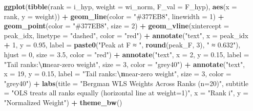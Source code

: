 \documentclass[
]{article}
\newenvironment{Shaded}{\begin{snugshade}}{\end{snugshade}}
\newcommand{\AttributeTok}[1]{\textcolor[rgb]{0.13,0.29,0.53}{#1}}
\newcommand{\DecValTok}[1]{\textcolor[rgb]{0.00,0.00,0.81}{#1}}
\newcommand{\FloatTok}[1]{\textcolor[rgb]{0.00,0.00,0.81}{#1}}
\newcommand{\FunctionTok}[1]{\textcolor[rgb]{0.13,0.29,0.53}{\textbf{#1}}}
\newcommand{\NormalTok}[1]{#1}
\newcommand{\SpecialCharTok}[1]{\textcolor[rgb]{0.81,0.36,0.00}{\textbf{#1}}}
\newcommand{\StringTok}[1]{\textcolor[rgb]{0.31,0.60,0.02}{#1}}
\begin{document}
\begin{Shaded}
\begin{Highlighting}[]
\FunctionTok{ggplot}\NormalTok{(}\FunctionTok{tibble}\NormalTok{(}\AttributeTok{rank =}\NormalTok{ i\_hyp, }\AttributeTok{weight =}\NormalTok{ wi\_norm, }\AttributeTok{F\_val =}\NormalTok{ F\_hyp),}
       \FunctionTok{aes}\NormalTok{(}\AttributeTok{x =}\NormalTok{ rank, }\AttributeTok{y =}\NormalTok{ weight)) }\SpecialCharTok{+}
  \FunctionTok{geom\_line}\NormalTok{(}\AttributeTok{color =} \StringTok{"\#377EB8"}\NormalTok{, }\AttributeTok{linewidth =} \DecValTok{1}\NormalTok{) }\SpecialCharTok{+}
  \FunctionTok{geom\_point}\NormalTok{(}\AttributeTok{color =} \StringTok{"\#377EB8"}\NormalTok{, }\AttributeTok{size =} \DecValTok{2}\NormalTok{) }\SpecialCharTok{+}
  \FunctionTok{geom\_vline}\NormalTok{(}\AttributeTok{xintercept =}\NormalTok{ peak\_idx, }\AttributeTok{linetype =} \StringTok{"dashed"}\NormalTok{, }\AttributeTok{color =} \StringTok{"red"}\NormalTok{) }\SpecialCharTok{+}
  \FunctionTok{annotate}\NormalTok{(}\StringTok{"text"}\NormalTok{, }\AttributeTok{x =}\NormalTok{ peak\_idx }\SpecialCharTok{+} \DecValTok{1}\NormalTok{, }\AttributeTok{y =} \FloatTok{0.95}\NormalTok{,}
           \AttributeTok{label =} \FunctionTok{paste0}\NormalTok{(}\StringTok{"Peak at F ≈ "}\NormalTok{, }\FunctionTok{round}\NormalTok{(peak\_F, }\DecValTok{3}\NormalTok{), }\StringTok{" ≈ 0.632"}\NormalTok{),}
           \AttributeTok{hjust =} \DecValTok{0}\NormalTok{, }\AttributeTok{size =} \FloatTok{3.5}\NormalTok{, }\AttributeTok{color =} \StringTok{"red"}\NormalTok{) }\SpecialCharTok{+}
  \FunctionTok{annotate}\NormalTok{(}\StringTok{"text"}\NormalTok{, }\AttributeTok{x =} \DecValTok{2}\NormalTok{, }\AttributeTok{y =} \FloatTok{0.15}\NormalTok{, }\AttributeTok{label =} \StringTok{"Tail ranks:}\SpecialCharTok{\textbackslash{}n}\StringTok{near{-}zero weight"}\NormalTok{,}
           \AttributeTok{size =} \DecValTok{3}\NormalTok{, }\AttributeTok{color =} \StringTok{"grey40"}\NormalTok{) }\SpecialCharTok{+}
  \FunctionTok{annotate}\NormalTok{(}\StringTok{"text"}\NormalTok{, }\AttributeTok{x =} \DecValTok{19}\NormalTok{, }\AttributeTok{y =} \FloatTok{0.15}\NormalTok{, }\AttributeTok{label =} \StringTok{"Tail ranks:}\SpecialCharTok{\textbackslash{}n}\StringTok{near{-}zero weight"}\NormalTok{,}
           \AttributeTok{size =} \DecValTok{3}\NormalTok{, }\AttributeTok{color =} \StringTok{"grey40"}\NormalTok{) }\SpecialCharTok{+}
  \FunctionTok{labs}\NormalTok{(}\AttributeTok{title =} \StringTok{"Bergman WLS Weights Across Ranks (n=20)"}\NormalTok{,}
       \AttributeTok{subtitle =} \StringTok{"OLS treats all ranks equally (horizontal line at weight=1)"}\NormalTok{,}
       \AttributeTok{x =} \StringTok{"Rank i"}\NormalTok{, }\AttributeTok{y =} \StringTok{"Normalized Weight"}\NormalTok{) }\SpecialCharTok{+}
  \FunctionTok{theme\_bw}\NormalTok{()}
\end{Highlighting}
\end{Shaded}
\end{document}
